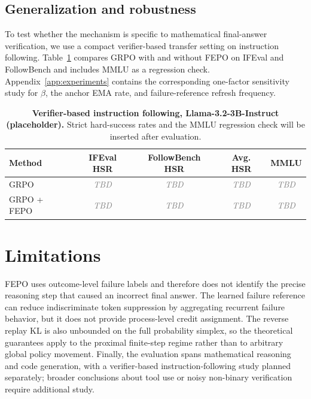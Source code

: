 \documentclass{article}
\newcommand{\TBD}{\textcolor{gray}{\textit{TBD}}}
\newcommand{\FEPO}{\textsc{FEPO}\xspace}
\begin{document}
\subsection{Generalization and robustness}
To test whether the mechanism is specific to mathematical final-answer verification, we use a compact verifier-based transfer setting on instruction following. Table~\ref{tab:crossdomain_compact} compares GRPO with and without \FEPO on IFEval and FollowBench and includes MMLU as a regression check. Appendix~\ref{app:experiments} contains the corresponding one-factor sensitivity study for $\beta$, the anchor EMA rate, and failure-reference refresh frequency.

\begin{table}[t]
\centering
\small
\begin{tabular}{lcccc}
\toprule
Method & IFEval HSR & FollowBench HSR & Avg. HSR & MMLU\\
\midrule
GRPO & \TBD & \TBD & \TBD & \TBD\\
GRPO + \FEPO & \TBD & \TBD & \TBD & \TBD\\
\bottomrule
\end{tabular}
\caption{\textbf{Verifier-based instruction following, Llama-3.2-3B-Instruct (placeholder).} Strict hard-success rates and the MMLU regression check will be inserted after evaluation.}
\label{tab:crossdomain_compact}
\end{table}

\section{Limitations}
\FEPO uses outcome-level failure labels and therefore does not identify the precise reasoning step that caused an incorrect final answer. The learned failure reference can reduce indiscriminate token suppression by aggregating recurrent failure behavior, but it does not provide process-level credit assignment. The reverse replay KL is also unbounded on the full probability simplex, so the theoretical guarantees apply to the proximal finite-step regime rather than to arbitrary global policy movement. Finally, the evaluation spans mathematical reasoning and code generation, with a verifier-based instruction-following study planned separately; broader conclusions about tool use or noisy non-binary verification require additional study.
\end{document}
